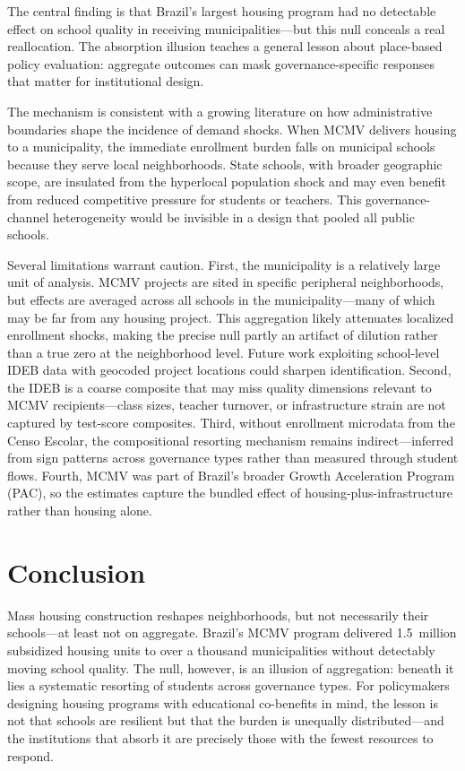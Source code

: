 \documentclass[12pt]{article}
\begin{document}
The central finding is that Brazil's largest housing program had no detectable effect on school quality in receiving municipalities---but this null conceals a real reallocation. The absorption illusion teaches a general lesson about place-based policy evaluation: aggregate outcomes can mask governance-specific responses that matter for institutional design.

The mechanism is consistent with a growing literature on how administrative boundaries shape the incidence of demand shocks. When MCMV delivers housing to a municipality, the immediate enrollment burden falls on municipal schools because they serve local neighborhoods. State schools, with broader geographic scope, are insulated from the hyperlocal population shock and may even benefit from reduced competitive pressure for students or teachers. This governance-channel heterogeneity would be invisible in a design that pooled all public schools.

Several limitations warrant caution. First, the municipality is a relatively large unit of analysis. MCMV projects are sited in specific peripheral neighborhoods, but effects are averaged across all schools in the municipality---many of which may be far from any housing project. This aggregation likely attenuates localized enrollment shocks, making the precise null partly an artifact of dilution rather than a true zero at the neighborhood level. Future work exploiting school-level IDEB data with geocoded project locations could sharpen identification. Second, the IDEB is a coarse composite that may miss quality dimensions relevant to MCMV recipients---class sizes, teacher turnover, or infrastructure strain are not captured by test-score composites. Third, without enrollment microdata from the Censo Escolar, the compositional resorting mechanism remains indirect---inferred from sign patterns across governance types rather than measured through student flows. Fourth, MCMV was part of Brazil's broader Growth Acceleration Program (PAC), so the estimates capture the bundled effect of housing-plus-infrastructure rather than housing alone.


\section{Conclusion}

Mass housing construction reshapes neighborhoods, but not necessarily their schools---at least not on aggregate. Brazil's MCMV program delivered 1.5~million subsidized housing units to over a thousand municipalities without detectably moving school quality. The null, however, is an illusion of aggregation: beneath it lies a systematic resorting of students across governance types. For policymakers designing housing programs with educational co-benefits in mind, the lesson is not that schools are resilient but that the burden is unequally distributed---and the institutions that absorb it are precisely those with the fewest resources to respond.
\end{document}
